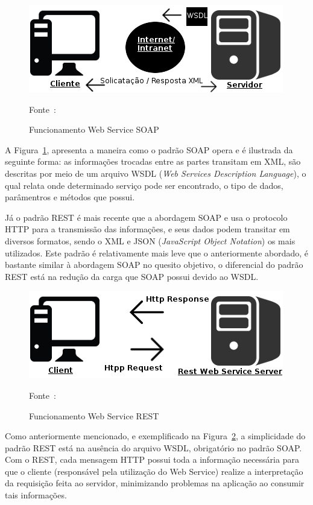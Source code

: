 \begin{figure}[H]
    \centering
    \includegraphics{imagens/soap}
    \caption{Funcionamento Web Service SOAP}
    Fonte~\cite{eulalio2016webservices}:
    \label{fig: SOAP}
\end{figure}

A Figura~\ref{fig: SOAP}, apresenta a maneira como o padrão SOAP opera e é ilustrada da seguinte forma: as informações trocadas entre as partes transitam em XML, são descritas por meio de um arquivo WSDL (\textit{Web Services Description Language}), o qual relata onde determinado serviço pode ser encontrado, o tipo de dados, parâmentros e métodos que possui.


Já o padrão REST é mais recente que a abordagem SOAP e usa o protocolo HTTP para a transmissão das informações, e seus dados podem transitar em diversos formatos, sendo o XML e JSON (\textit{JavaScript Object Notation}) os mais utilizados.
Este padrão é relativamente mais leve que o anteriormente abordado\cite{tihomirovs2016webservices}, é bastante similar à abordagem SOAP no quesito objetivo, o diferencial do padrão REST está na redução da carga que SOAP possui devido ao WSDL\cite{eulalio2016webservices}.

\begin{figure}[H]
    \centering
    \includegraphics{imagens/rest}
    \caption{Funcionamento Web Service REST}
    Fonte~\cite{eulalio2016webservices}:
    \label{fig: REST}
\end{figure}

Como anteriormente mencionado, e exemplificado na Figura~\ref{fig: REST}, a simplicidade do padrão REST está na ausência do arquivo WSDL, obrigatório no padrão SOAP. Com o REST, cada mensagem HTTP possui toda a informação necessária para que o cliente (responsável pela utilização do Web Service) realize a interpretação da requisição feita ao servidor, minimizando problemas na aplicação ao consumir tais informações\cite{eulalio2016webservices}.

